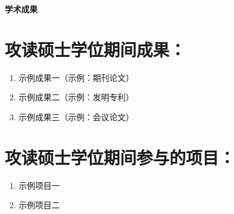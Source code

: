 \cleardoublepage
{}
{}
\begin{center}
    \bfseries{} 学术成果
\end{center}

\section*{攻读硕士学位期间成果：}
\begin{enumerate}
    \item 示例成果一（示例：期刊论文）
    \item 示例成果二（示例：发明专利）
    \item 示例成果三（示例：会议论文）
\end{enumerate}

\section*{攻读硕士学位期间参与的项目：}
\begin{enumerate}
    \item 示例项目一
    \item 示例项目二
\end{enumerate}
